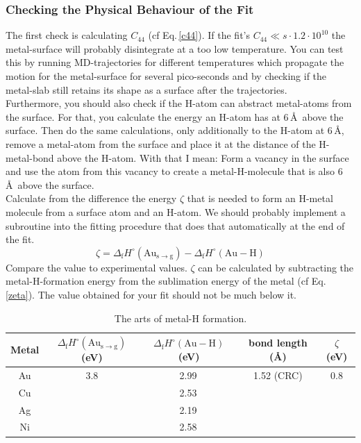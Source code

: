\documentclass[twoside, 11pt, titlepage, captions=nooneline, a4paper, headsepline]{scrbook}%
\newcommand{\9}{\mathrm}
\newcommand{\0}{\,\mathrm}
\begin{document}
\subsubsection*{Checking the Physical Behaviour of the Fit}
The first check is calculating $C_{44}$ (cf Eq.\,\ref{c44}). If the fit's $C_{44}\ll s\cdot1.2\cdot10^{10}$ the metal-surface will probably disintegrate at a too low temperature. You can test this by running MD-trajectories for different temperatures which propagate the motion for the metal-surface for several pico-seconds and by checking if the metal-slab still retains its shape as a surface after the trajectories.\\
Furthermore, you should also check if the H-atom can abstract metal-atoms from the surface. For that, you calculate the energy an H-atom has at 6\,\AA~above the surface. Then do the same calculations, only additionally to the H-atom at 6\,\AA, remove a metal-atom from the surface and place it at the distance of the H-metal-bond above the H-atom. With that I mean: Form a vacancy in the surface and use the atom from this vacancy to create a metal-H-molecule that is also 6\,\AA~above the surface.\\
Calculate from the difference the energy $\zeta$ that is needed to form an H-metal molecule from a surface atom and an H-atom. We should probably implement a subroutine into the fitting procedure that does that automatically at the end of the fit.\\
\begin{equation}
\zeta = \Delta_\mathrm{f} H^\circ(\mathrm{Au_{s\rightarrow g}})-\Delta_\mathrm{f}H^\circ(\mathrm{Au-H})
\label{zeta}
\end{equation}
Compare the value to experimental values. $\zeta$ can be calculated by subtracting the metal-H-formation energy from the sublimation energy of the metal (cf Eq.\,\ref{zeta}). The value obtained for your fit should not be much below it.
\begin{table}[t!]
\centering
\caption{The arts of metal-H formation.}
\label{auh}
\begin{tabular}{ccccc}
\hline\hline
Metal&$\Delta_\mathrm{f} H^\circ(\mathrm{Au_{s\rightarrow g}})$(eV)&$\Delta_\mathrm{f}H^\circ(\mathrm{Au-H})$(eV)&bond length (\AA)&$\zeta$ (eV)\\
\hline
Au&3.8\cite{hildenbrand1962}&2.99\,\cite{kant1979}&1.52 (CRC)&0.8\\
Cu&&2.53\,\cite{kant1979}&&\\
Ag&&2.19\,\cite{kant1979}&&\\
Ni&&2.58\,\cite{kant1979}&&\\
\hline\hline
\end{tabular}
\end{table}
\end{document}

